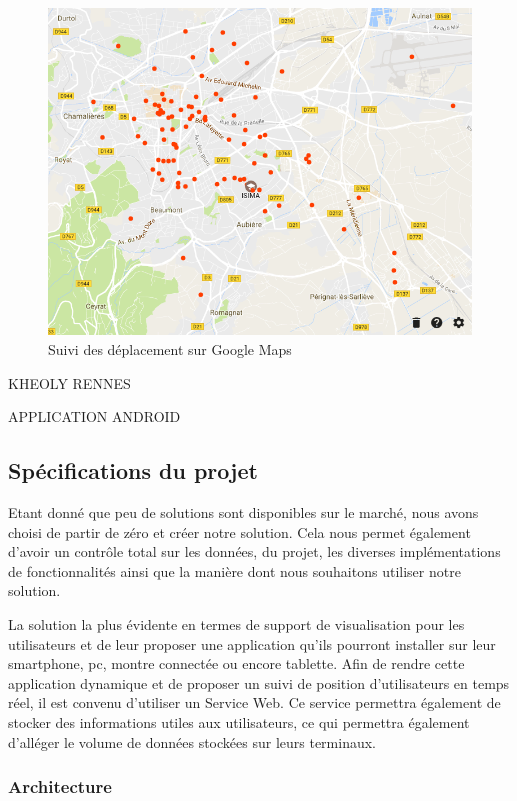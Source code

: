 \begin{figure}[H]
    \centering
    \includegraphics[width=\textwidth]{./img/googlemaps.png}
    \caption{Suivi des déplacement sur Google Maps}
    \label{google-maps}
\end{figure}

KHEOLY RENNES

APPLICATION ANDROID

\subsection{Spécifications du projet}

Etant donné que peu de solutions sont disponibles sur le marché, nous avons choisi de partir de zéro et créer notre solution. Cela nous permet également d'avoir un contrôle total sur les données, du projet, les diverses implémentations de fonctionnalités ainsi que la manière dont nous souhaitons utiliser notre solution.

La solution la plus évidente en termes de support de visualisation pour les utilisateurs et de leur proposer une application qu'ils pourront installer sur leur smartphone, pc, montre connectée ou encore tablette.
Afin de rendre cette application dynamique et de proposer un suivi de position d'utilisateurs en temps réel, il est convenu d'utiliser un Service Web. Ce service permettra également de stocker des informations utiles aux utilisateurs, ce qui permettra également d'alléger le volume de données stockées sur leurs terminaux.

\subsubsection{Architecture}

